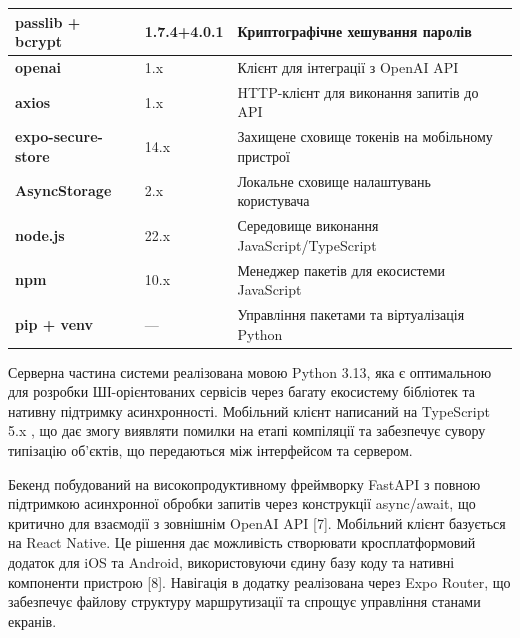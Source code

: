 {\def\LTcaptype{none} %
\begin{longtable}[]{@{}
  >{\raggedright\arraybackslash}p{}
  >{\raggedright\arraybackslash}p{}
  >{\raggedright\arraybackslash}p{}@{}}
\toprule\noalign{}
\begin{minipage}[b]{\linewidth}\raggedright
\textbf{passlib + bcrypt}
\end{minipage} & \begin{minipage}[b]{\linewidth}\raggedright
1.7.4+4.0.1
\end{minipage} & \begin{minipage}[b]{\linewidth}\raggedright
Криптографічне хешування паролів
\end{minipage} \\
\midrule\noalign{}
\endhead
\bottomrule\noalign{}
\endlastfoot
\textbf{openai} & 1.x & Клієнт для інтеграції з OpenAI API \\
\textbf{axios} & 1.x & HTTP-клієнт для виконання запитів до API \\
\textbf{expo-secure-store} & 14.x & Захищене сховище токенів на
мобільному пристрої \\
\textbf{AsyncStorage} & 2.x & Локальне сховище налаштувань
користувача \\
\textbf{node.js} & 22.x & Середовище виконання JavaScript/TypeScript \\
\textbf{npm} & 10.x & Менеджер пакетів для екосистеми JavaScript \\
\textbf{pip + venv} & --- & Управління пакетами та віртуалізація
Python \\
\end{longtable}
}

Серверна частина системи реалізована мовою Python 3.13, яка є
оптимальною для розробки ШІ-орієнтованих сервісів через багату
екосистему бібліотек та нативну підтримку асинхронності. Мобільний
клієнт написаний на TypeScript 5.x , що дає змогу виявляти помилки на
етапі компіляції та забезпечує сувору типізацію об'єктів, що передаються
між інтерфейсом та сервером.

Бекенд побудований на високопродуктивному фреймворку FastAPI з повною
підтримкою асинхронної обробки запитів через конструкції async/await, що
критично для взаємодії з зовнішнім OpenAI API {[}7{]}. Мобільний клієнт
базується на React Native. Це рішення дає можливість створювати
кросплатформовий додаток для iOS та Android, використовуючи єдину базу
коду та нативні компоненти пристрою {[}8{]}. Навігація в додатку
реалізована через Expo Router, що забезпечує файлову структуру
маршрутизації та спрощує управління станами екранів.

